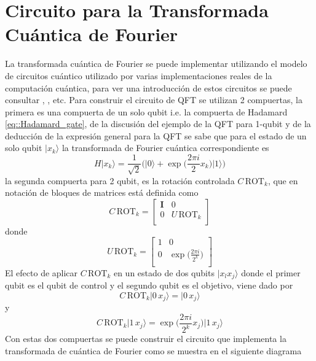 \documentclass[a4paper]{article}
\begin{document}
\section{Circuito para la Transformada Cuántica de Fourier}
La transformada cuántica de Fourier se puede implementar utilizando el modelo de circuitos cuántico utilizado por varias implementaciones reales de la computación cuántica, para ver una introducción de estos circuitos  se puede consultar \cite{Qiskit}, \cite{Medina}, \cite{Nielsen} etc. Para construir el circuito de QFT se utilizan 2 compuertas, la primera es una compuerta de un solo qubit i.e. la compuerta de Hadamard \ref{eq::Hadamard_gate}, de la discusión del ejemplo de la QFT para 1-qubit y de la deducción de la expresión general para la QFT se sabe que para el estado de un solo qubit $\vert x_k\rangle$ la transformada de Fourier cuántica correspondiente es 
\begin{equation}
H\vert x_k\rangle=\frac{1}{\sqrt{2}}\bigg(\vert 0\rangle + \exp{\bigg(\frac{2\pi i}{2} x_k}\bigg)\vert 1\rangle\bigg)
\end{equation}
la segunda compuerta para 2 qubit, es la rotación controlada $C\,\text{ROT}_k$, que en notación de bloques de matrices está definida como 
\begin{equation}
C\,\text{ROT}_k=
\begin{bmatrix}
\mathbf{I}& 0\\
0& U\,\text{ROT}_k\\
\end{bmatrix}
\end{equation}
donde 
\begin{equation}
U\,\text{ROT}_k=
\begin{bmatrix}
1& 0\\
0& \exp{\big(\frac{2\pi i}{2^k}\big)}\\
\end{bmatrix}
\end{equation}
El efecto de aplicar $C\,\text{ROT}_k$ en un estado de dos qubits $\vert x_l x_j\rangle$ donde el primer qubit es el qubit de control y el segundo qubit es el objetivo, viene dado por
\begin{equation}
C\,\text{ROT}_k \vert 0\,x_j\rangle=\vert 0 \, x_j\rangle
\end{equation}
y
\begin{equation}
C\,\text{ROT}_k \vert 1\,x_j\rangle=\exp{\bigg(\frac{2\pi i }{2^k} x_j\bigg)}\vert 1 \, x_j\rangle
\end{equation}
Con estas dos compuertas se puede construir el circuito que implementa la transformada de cuántica de Fourier como se muestra en el siguiente diagrama\\
\end{document}
